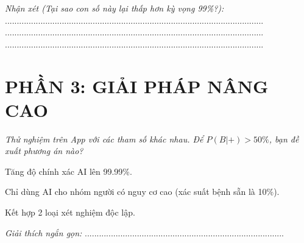 \documentclass[12pt,a4paper]{article}
\begin{document}
\textit{Nhận xét (Tại sao con số này lại thấp hơn kỳ vọng 99\%?):}
.............................................................................................................
.............................................................................................................
.............................................................................................................

\section*{\color{medblue} PHẦN 3: GIẢI PHÁP NÂNG CAO}
\textit{Thử nghiệm trên App với các tham số khác nhau. Để $P(B|+) > 50\%$, bạn đề xuất phương án nào?}
\begin{checkbox}
    \item Tăng độ chính xác AI lên 99.99\%.
    \item Chỉ dùng AI cho nhóm người có nguy cơ cao (xác suất bệnh sẵn là 10\%).
    \item Kết hợp 2 loại xét nghiệm độc lập.
\end{checkbox}
\textit{Giải thích ngắn gọn:} ....................................................................................
\end{document}
